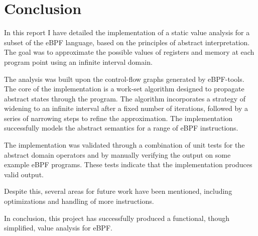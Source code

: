 \section{Conclusion} 
In this report I have detailed the implementation of a
static value analysis for a subset of the eBPF language, based on the
principles of abstract interpretation. The goal was to approximate the possible
values of registers and memory at each program point using an infinite interval
domain.

The analysis was built upon the control-flow graphs generated by eBPF-tools.
The core of the implementation is a work-set algorithm designed to propagate
abstract states through the program. The algorithm incorporates a strategy of
widening to an infinite interval after a fixed number of iterations, followed
by a series of narrowing steps to refine the approximation. The implementation
successfully models the abstract semantics for a range of eBPF instructions.

The implementation was validated through a combination of unit tests for the
abstract domain operators and by manually verifying the output on some example
eBPF programs. These tests indicate that the implementation produces valid
output. 

Despite this, several areas for future work have been mentioned, including
optimizations and handling of more instructions. 

In conclusion, this project has successfully produced a functional, though
simplified, value analysis for eBPF. 
